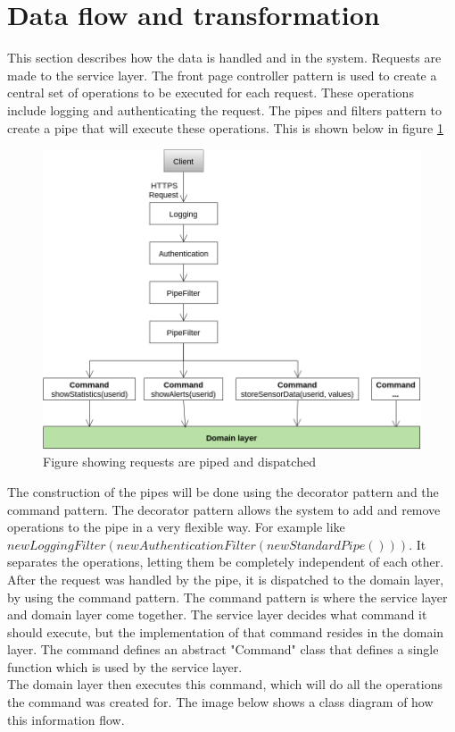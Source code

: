 \section{Data flow and transformation}
\label{sec:dataflow}
This section describes how the data is handled and in the system. Requests are made to the service layer. The front page controller pattern is used to create a central set of operations to be executed for each request. These operations include logging and authenticating the request. The pipes and filters pattern to create a pipe that will execute these operations. This is shown below in figure \ref{fig:frontflow}
\begin{figure}[H]
\centering
\includegraphics[width=0.8\linewidth]{7-software/images/FrontFlow.png}
\caption{Figure showing requests are piped and dispatched}
\label{fig:frontflow}
\end{figure}

The construction of the pipes will be done using the decorator pattern and the command pattern. The decorator pattern allows the system to add and remove operations to the pipe in a very flexible way. For example like $new LoggingFilter(new AuthenticationFilter(new StandardPipe()))$. It separates the operations, letting them be completely independent of each other.\\
After the request was handled by the pipe, it is dispatched to the domain layer, by using the command pattern. The command pattern is where the service layer and domain layer come together. The service layer decides what command it should execute, but the implementation of that command resides in the domain layer. The command defines an abstract "Command" class that defines a single function which is used by the service layer.\\
The domain layer then executes this command, which will do all the operations the command was created for. The image below shows a class diagram of how this information flow.

